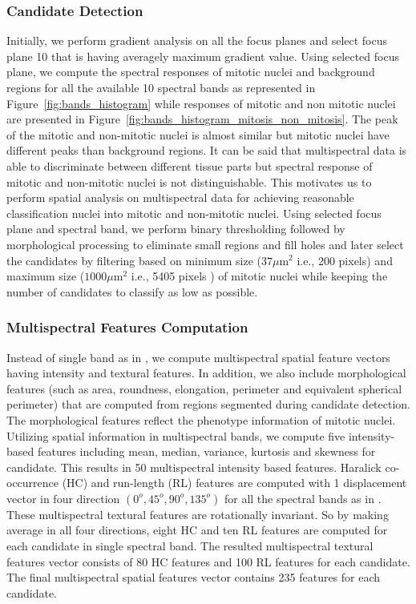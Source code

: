 \documentclass[10pt,twocolumn,letterpaper]{article}
\begin{document}
\subsubsection{Candidate Detection}
Initially, we perform gradient analysis on all the focus planes and select focus plane 10 that is having averagely maximum gradient value. Using selected focus plane, we compute the spectral responses of mitotic nuclei and background regions for all the available 10 spectral bands as represented in Figure~\ref{fig:bands_histogram} while responses of mitotic and non mitotic nuclei are presented in Figure~\ref{fig:bands_histogram_mitosis_non_mitosis}. The peak of the mitotic and non-mitotic nuclei is almost similar but mitotic nuclei have different peaks than background regions. It can be said that multispectral data is able to discriminate between different tissue parts but spectral response of mitotic and non-mitotic nuclei is not distinguishable. This motivates us to perform spatial analysis on multispectral data for achieving reasonable classification nuclei into mitotic and non-mitotic nuclei. Using selected focus plane and spectral band, we perform binary thresholding followed by morphological processing to eliminate small regions and fill holes and later select the candidates by filtering based on minimum size ($37\mu\text{m}^2$ i.e., 200 pixels) and maximum size ($1000\mu\text{m}^2$ i.e., 5405 pixels ) of mitotic nuclei while keeping the number of candidates to classify as low as possible. 

\subsubsection{Multispectral Features Computation}
Instead of single band as in \cite{boucheron2007, masood2009, wu2009, wu2012}, we compute multispectral spatial feature vectors having intensity and textural features. In addition, we also include morphological features (such as area, roundness, elongation, perimeter and equivalent spherical perimeter) that are computed from regions segmented during candidate detection. The morphological features reflect the phenotype information of mitotic nuclei. Utilizing spatial information in multispectral bands, we compute five intensity-based features including mean, median, variance, kurtosis and skewness for candidate. This results in 50 multispectral intensity based features. Haralick co-occurrence (HC) \cite{haralick1973} and run-length (RL) \cite{galloway1975} features are computed with 1 displacement vector in four direction $(0^o, 45^o, 90^o, 135^o)$ for all the spectral bands as in \cite{irshad2013b}. These multispectral textural features are rotationally invariant. So by making average in all four directions, eight HC and ten RL features are computed for each candidate in single spectral band. The resulted multispectral textural features vector consists of 80 HC features and 100 RL features for each candidate. The final multispectral spatial features vector contains 235 features for each candidate. 
\end{document}
